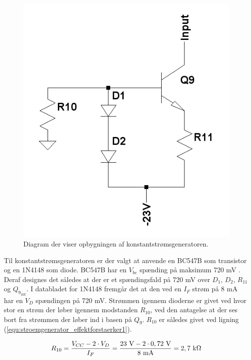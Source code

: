 \begin{figure}[h]
\centering
\includegraphics[scale=0.35]{teknisk/effektforstaerker/stoemgenerator.png}
\caption{Diagram der viser opbygningen af konstantstrømsgeneratoren.}
\label{konstantstroemsgenerator_model}
\end{figure}

Til konstantstrømsgeneratoren er der valgt at anvende en BC547B som transistor og en 1N4148 som diode. BC547B har en $V_{be}$ spænding på maksimum 720 mV \cite{bc547b-datablad}. Deraf designes det således at der er et spændingsfald på 720 mV over $D_1$, $D_2$, $R_{\mathrm{11}}$ og $Q_{9_{BE}}$. I databladet for 1N4148 \cite{1n4148-datablad} fremgår det at den  ved en $I_F$ strøm på 8 mA har en $V_D$ spændingen på 720 mV. Strømmen igennem dioderne er givet ved hvor stor en strøm der løber igennem modstanden $R_{\mathrm{10}}$, ved den antagelse at der ses bort fra strømmen der løber ind i basen på $Q_9$. $R_{\mathrm{10}}$ er således givet ved ligning (\ref{equ:stroemgenerator_effektforstaerker1}).

\begin{equation}
\label{equ:stroemgenerator_effektforstaerker1}
R_{\mathrm{10}} = \frac{V_{CC} - 2 \cdot V_D}{I_F} = \mathrm{\frac{23~\mathrm{V} - 2 \cdot 0,72~\mathrm{V}}{8~\mathrm{mA}} = 2,7~\mathrm{k}\ohm}
\end{equation}

